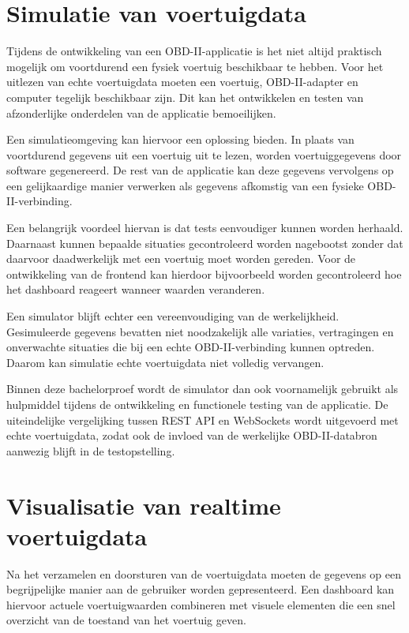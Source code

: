 \section{Simulatie van voertuigdata}
Tijdens de ontwikkeling van een OBD-II-applicatie is het niet altijd praktisch
mogelijk om voortdurend een fysiek voertuig beschikbaar te hebben. Voor het
uitlezen van echte voertuigdata moeten een voertuig, OBD-II-adapter en computer
tegelijk beschikbaar zijn. Dit kan het ontwikkelen en testen van afzonderlijke
onderdelen van de applicatie bemoeilijken.

Een simulatieomgeving kan hiervoor een oplossing bieden. In plaats van
voortdurend gegevens uit een voertuig uit te lezen, worden voertuiggegevens
door software gegenereerd. De rest van de applicatie kan deze gegevens
vervolgens op een gelijkaardige manier verwerken als gegevens afkomstig van
een fysieke OBD-II-verbinding.

Een belangrijk voordeel hiervan is dat tests eenvoudiger kunnen worden
herhaald. Daarnaast kunnen bepaalde situaties gecontroleerd worden nagebootst
zonder dat daarvoor daadwerkelijk met een voertuig moet worden gereden. Voor
de ontwikkeling van de frontend kan hierdoor bijvoorbeeld worden gecontroleerd
hoe het dashboard reageert wanneer waarden veranderen.

Een simulator blijft echter een vereenvoudiging van de werkelijkheid.
Gesimuleerde gegevens bevatten niet noodzakelijk alle variaties, vertragingen
en onverwachte situaties die bij een echte OBD-II-verbinding kunnen optreden.
Daarom kan simulatie echte voertuigdata niet volledig vervangen.

Binnen deze bachelorproef wordt de simulator dan ook voornamelijk gebruikt als
hulpmiddel tijdens de ontwikkeling en functionele testing van de applicatie.
De uiteindelijke vergelijking tussen REST API en WebSockets wordt uitgevoerd
met echte voertuigdata, zodat ook de invloed van de werkelijke
OBD-II-databron aanwezig blijft in de testopstelling.

\section{Visualisatie van realtime voertuigdata}
Na het verzamelen en doorsturen van de voertuigdata moeten de gegevens op een
begrijpelijke manier aan de gebruiker worden gepresenteerd. Een dashboard kan
hiervoor actuele voertuigwaarden combineren met visuele elementen die een
snel overzicht van de toestand van het voertuig geven.

